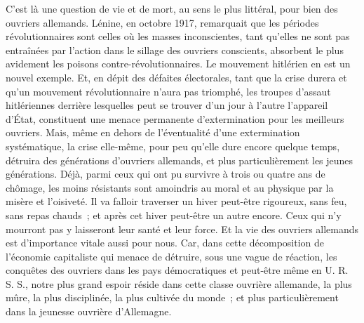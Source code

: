 \documentclass[french,twoside]{book} %
\begin{document}
C'est là une question de vie et de mort, au sens le plus littéral, pour bien des ouvriers allemands. Lénine, en octobre 1917, remarquait que les périodes révolutionnaires sont celles où les masses inconscientes, tant qu'elles ne sont pas entraînées par l'action dans le sillage des ouvriers conscients, absorbent le plus avidement les poisons contre-révolutionnaires. Le mouvement hitlérien en est un nouvel exemple. Et, en dépit des défaites électorales, tant que la crise durera et qu'un mouvement révolutionnaire n'aura pas triomphé, les trou­pes d'assaut hitlériennes derrière lesquelles peut se trouver d'un jour à l'autre l'appareil d'État, constituent une menace permanente d'extermination pour les meilleurs ouvriers. Mais, même en dehors de l'éventualité d'une extermination systématique, la crise elle-même, pour peu qu'elle dure encore quelque temps, détruira des générations d'ouvriers allemands, et plus particulièrement les jeunes générations. Déjà, parmi ceux qui ont pu survivre à trois ou quatre ans de chômage, les moins résistants sont amoindris au moral et au physique par la misère et l'oisiveté. Il va falloir traverser un hiver peut-être rigoureux, sans feu, sans repas chauds ; et après cet hiver peut-être un autre encore. Ceux qui n'y mourront pas y laisseront leur santé et leur force. Et la vie des ouvriers allemands est d'importance vitale aussi pour nous. Car, dans cette décompo­sition de l'économie capitaliste qui menace de détruire, sous une vague de réaction, les conquêtes des ouvriers dans les pays démocratiques et peut-être même en U. R. S. S., notre plus grand espoir réside dans cette classe ouvrière allemande, la plus mûre, la plus disciplinée, la plus cultivée du monde ; et plus particulièrement dans la jeunesse ouvrière d'Allemagne.\par
\end{document}
